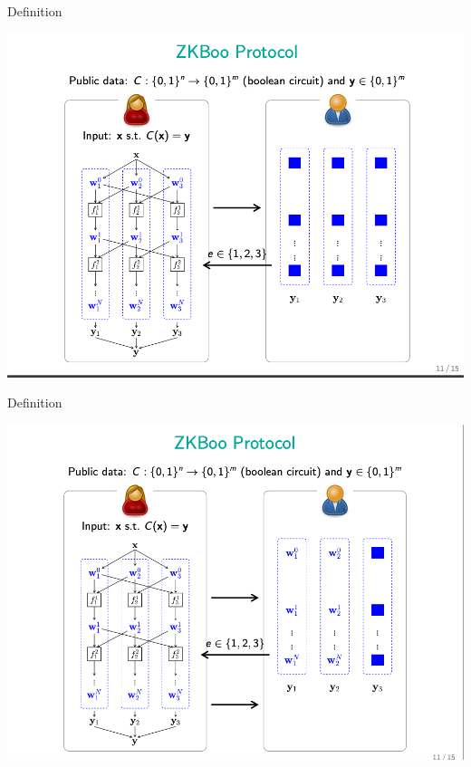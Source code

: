 \documentclass{beamer}
\begin{document}
\begin{frame}{Definition}
	\begin{minipage}{0.42\linewidth}
		\includegraphics[scale=0.4]{f22.png}
	\end{minipage}
\end{frame}



\begin{frame}{Definition}
	\begin{minipage}{0.42\linewidth}
		\includegraphics[scale=0.4]{f23.png}
	\end{minipage}
\end{frame}
\end{document}
